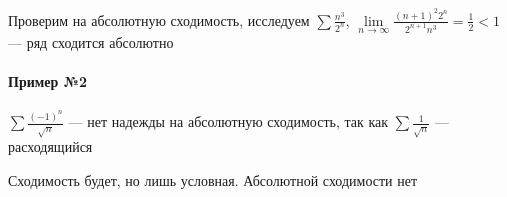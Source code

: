 \documentclass{article}
\begin{document}
Проверим на абсолютную сходимость, исследуем $\sum \frac{n^3}{2^{n}}$, $\lim\limits_{n \to \infty} \frac{(n + 1)^2 2^{n}}{2^{n + 1} n^3} = \frac{1}{2} < 1$ — ряд сходится абсолютно

\paragraph{Пример №2} $\sum \frac{(-1)^{n}}{\sqrt{n}}$ — нет надежды на абсолютную сходимость, так как $\sum \frac{1}{\sqrt{n}}$ — расходящийся

Сходимость будет, но лишь условная. Абсолютной сходимости нет
\end{document}
